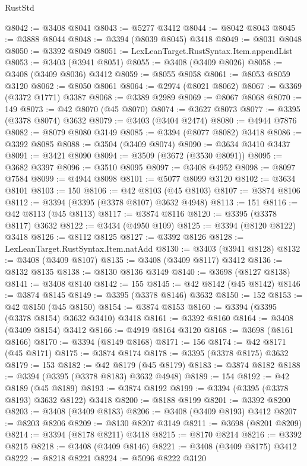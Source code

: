 \begin{lexlean}{RustStd}
\begin{coremodule}
@8042 := @3408 @8041
@8043 := @5277 @3412
@8044 := @8042 @8043
@8045 := @3888 @8044
@8048 := @3394 (@8039 @8045) @3418
@8049 := @8031 @8048
@8050 := @3392 @8049
@8051 := LexLeanTarget.RustSyntax.Item.appendList
@8053 := @3403 (@3941 @8051)
@8055 := @3408 (@3409 @8026)
@8058 := @3408 (@3409 @8036) @3412
@8059 := @8055 @8058
@8061 := @8053 @8059 @3120
@8062 := @8050 @8061
@8064 := @2974 (@8021 @8062)
@8067 := @3369 (@3372 @1771) @3387
@8068 := @3389 @2989
@8069 := @8067 @8068
@8070 := 149
@8073 := @42 @8070 (@45 @8070)
@8074 := @3627 @8073
@8077 := @3395 (@3378 @8074) @3632
@8079 := @3403 (@3404 @2474)
@8080 := @4944 @7876
@8082 := @8079 @8080 @3149
@8085 := @3394 (@8077 @8082) @3418
@8086 := @3392 @8085
@8088 := @3504 (@3409 @8074)
@8090 := @3634 @3410 @3437
@8091 := @3421 @8090
@8094 := @3509 (@3672 (@3530 @8091))
@8095 := @3682 @3397
@8096 := @3510 @8095
@8097 := @3408 @4952
@8098 := @8097 @7584
@8099 := @4944 @8098
@8101 := @5077 @8099 @3120
@8102 := @3634 @8101
@8103 := 150
@8106 := @42 @8103 (@45 @8103)
@8107 := @3874 @8106
@8112 := @3394 (@3395 (@3378 @8107) @3632 @4948)
@8113 := 151
@8116 := @42 @8113 (@45 @8113)
@8117 := @3874 @8116
@8120 := @3395 (@3378 @8117) @3632
@8122 := @3434 (@4950 @109)
@8125 := @3394 (@8120 @8122) @3418
@8126 := @8112 @8125
@8127 := @3392 @8126
@8128 := LexLeanTarget.RustSyntax.Item.natAdd
@8130 := @3403 (@3941 @8128)
@8132 := @3408 (@3409 @8107)
@8135 := @3408 (@3409 @8117) @3412
@8136 := @8132 @8135
@8138 := @8130 @8136 @3149
@8140 := @3698 (@8127 @8138)
@8141 := @3408 @8140
@8142 := 155
@8145 := @42 @8142 (@45 @8142)
@8146 := @3874 @8145
@8149 := @3395 (@3378 @8146) @3632
@8150 := 152
@8153 := @42 @8150 (@45 @8150)
@8154 := @3874 @8153
@8160 := @3394 (@3395 (@3378 @8154) @3632 @3410) @3418
@8161 := @3392 @8160
@8164 := @3408 (@3409 @8154) @3412
@8166 := @4919 @8164 @3120
@8168 := @3698 (@8161 @8166)
@8170 := @3394 (@8149 @8168)
@8171 := 156
@8174 := @42 @8171 (@45 @8171)
@8175 := @3874 @8174
@8178 := @3395 (@3378 @8175) @3632
@8179 := 153
@8182 := @42 @8179 (@45 @8179)
@8183 := @3874 @8182
@8188 := @3394 (@3395 (@3378 @8183) @3632 @4948)
@8189 := 154
@8192 := @42 @8189 (@45 @8189)
@8193 := @3874 @8192
@8199 := @3394 (@3395 (@3378 @8193) @3632 @8122) @3418
@8200 := @8188 @8199
@8201 := @3392 @8200
@8203 := @3408 (@3409 @8183)
@8206 := @3408 (@3409 @8193) @3412
@8207 := @8203 @8206
@8209 := @8130 @8207 @3149
@8211 := @3698 (@8201 @8209)
@8214 := @3394 (@8178 @8211) @3418
@8215 := @8170 @8214
@8216 := @3392 @8215
@8218 := @3408 (@3409 @8146)
@8221 := @3408 (@3409 @8175) @3412
@8222 := @8218 @8221
@8224 := @5096 @8222 @3120

\end{coremodule}
\end{lexlean}
